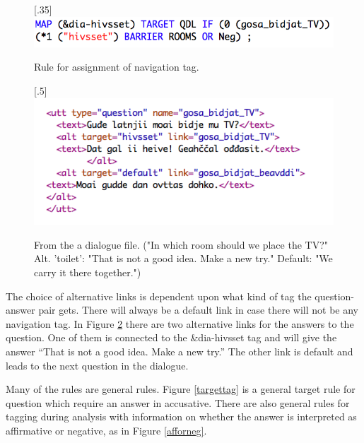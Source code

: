 \documentclass[11pt]{article}
\begin{document}
\begin{figure}[htbp]
\begin{center}
\scalebox{.35}[.35]{\includegraphics{presentation/img/hivsset_tag.png}}\\
\caption{Rule for assignment of navigation tag.}
\label{hivssettag}
\end{center}
\end{figure}



\begin{figure}[htbp]
\begin{center}
\scalebox{.5}[.5]{\includegraphics{presentation/img/gosabidjatTV.png}}\\
\caption{From the a dialogue file. ("In which room should we place the TV?" Alt. 'toilet': "That is not a good idea. Make a new try." Default: "We carry it there together.") 
}
\label{altlinks}
\end{center}
\end{figure}

The choice of alternative links is dependent upon what kind of tag the question-answer pair gets. There will always be a default link in case there will not be any navigation tag. In Figure \ref{altlinks} there are two alternative links for the answers to the question. One of them is connected to the \&dia-hivsset tag and will give the answer “That is not a good idea. Make a new try.” The other link is default and leads to the next question in the dialogue. 

Many of the rules are general rules. Figure \ref{targettag} is a general target rule for question which require an answer in accusative. There are also general rules for tagging during analysis with information on whether the answer is interpreted as affirmative or negative, as in Figure \ref{afforneg}.
 
\end{document}
